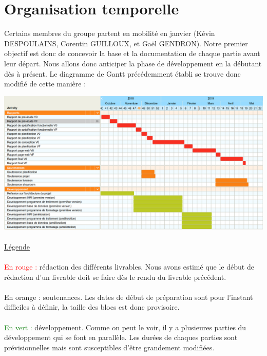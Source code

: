 \section{Organisation temporelle}

Certains membres du groupe partent en mobilité en janvier (Kévin DESPOULAINS,
Corentin GUILLOUX, et Gaël GENDRON). Notre premier objectif est donc de
concevoir la base et la documentation de chaque partie avant leur départ.
Nous allons donc anticiper la phase de développement en la débutant dès à
présent. Le diagramme de Gantt précédemment établi se trouve donc modifié de
cette manière :

\newpage

\begin{mdframed}[frametitle={Figure 17 : Estimation de la planification des tâches}, innerbottommargin=10]
\begin{center}
\includegraphics[scale=0.85]{gantt.png}
\end{center}
\end{mdframed}

\paragraph{}
\underline{Légende}

\paragraph{}
\textcolor{red}{En rouge : } rédaction des différents livrables. Nous avons estimé que le début de rédaction d’un livrable doit se faire dès le rendu du livrable précédent.

\paragraph{}
\textcolor{RedOrange}{En orange : } soutenances. Les dates de début de préparation sont pour l’instant difficiles à définir, la taille des blocs est donc provisoire.

\paragraph{}
\textcolor{ForestGreen}{En vert : } développement. Comme on peut le voir, il y a plusieures parties du développement qui se font en parallèle. Les durées de chaques parties sont prévisionnelles mais sont susceptibles d’être grandement modifiées.
